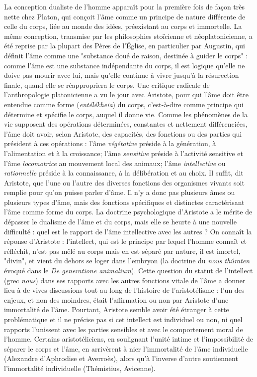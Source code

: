 La conception dualiste de l'homme apparaît pour la première fois de façon très nette chez Platon, qui conçoit l'âme comme un principe de nature différente de celle du corps, liée au monde des idées, préexistant au corps et immortelle. La même conception, transmise par les philosophies stoïcienne et néoplatonicienne, a été reprise par la plupart des Pères de l'Église, en particulier par Augustin, qui définit l'âme comme une "substance doué de raison, destinée à guider le corps" : comme l'âme est une substance indépendante du corps, il est logique qu'elle ne doive pas mourir avec lui, mais qu'elle continue à vivre jusqu'à la résurection finale, quand elle se réappropriera le corps. Une critique radicale de l'anthropologie platonicienne a vu le jour avec Aristote, pour qui l'âme doit être entendue comme forme ({\it entélékheia}) du corps, c'est-à-dire comme principe qui détermine et spécifie le corps, auquel il donne vie. Comme les phénomènes de la vie supposent des opérations déterminées, constantes et nettement différenciées, l'âme doit avoir, selon Aristote, des capacités, des fonctions ou des parties qui président à ces opérations : l'âme {\it végétative} préside à la génération, à l'alimentation et à la croissance; l'âme {\it sensitive} préside à l'activité sensitive et l'âme {\it locomotrice} au mouvement local des animaux; l'âme  {\it intellective} ou  {\it rationnelle} préside à la connaissance, à la délibération et au choix. Il suffit, dit Aristote, que l'une ou l'autre des diverses fonctions des organismes vivants soit remplie pour qu'on puisse parler d'âme. Il n'y a donc pas plusieurs âmes ou plusieurs types d'âme, mais des fonctions spécifiques et distinctes caractérisant l'âme comme forme du corps. La doctrine psychologique d'Aristote a le mérite de dépasser le dualisme de l'âme et du corps, mais elle se heurte à une nouvelle difficulté : quel est le rapport de l'âme intellective avec les autres ? On connaît la réponse d'Aristote : l'intellect, qui est le principe par lequel l'homme connaît et réfléchit, n'est pas mêlé au corps mais en est séparé par nature, il est imortel, "divin", et vient du dehors se loger dans l'embryon (la doctrine du  {\it nous thûraten} évoqué dans le  {\it De generatione animalium}). Cette question du statut de l'intellect (grec {\it nous}) dans ses rapports avec les autres fonctions vitale de l'âme a donner lieu à de vives discussions tout au long de l'histoire de l'aristotélisme : l'un des enjeux, et non des moindres, était l'affirmation ou non par Aristote d'une immortalité de l'âme. Pourtant, Aristote semble avoir été étranger à cette problématique et il ne précise pas si cet intellect est individuel ou non, ni quel rapports l'unissent avec les parties sensibles et avec le comportement moral de l'homme. Certains aristotéliciens, en soulignant l'unité intime et l'impossibilité de séparer le corps et l'âme, en arrivèrent à nier l'immortalité de l'âme individuelle (Alexandre d'Aphrodise et Averroès), alors qu'à l'inverse d'autre soutiennent l'immortalité individuelle (Thémistius, Avicenne).

